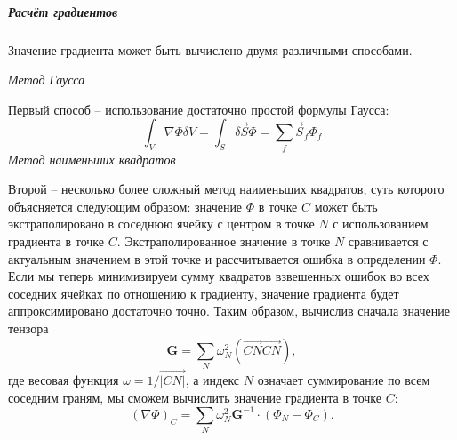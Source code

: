 		\subparagraph{Расчёт градиентов\\}
		
		    Значение градиента может быть вычислено двумя различными способами.
			
			\textit{Метод Гаусса}
			
			Первый способ -- использование достаточно простой формулы Гаусса:
			\begin{equation}
				\int_V \nabla \Phi \delta V = \int_S \vec{\delta S} \Phi = \sum_f \vec{S}_f \Phi_f
			\end{equation}
			\newpage
			\textit{Метод наименьших квадратов}
			
			Второй -- несколько более сложный метод наименьших квадратов, суть которого объясняется следующим образом: значение $\Phi$ в точке $C$ может быть экстраполировано в соседнюю ячейку с центром в точке $N$ с использованием градиента в точке $C$. Экстраполированное значение в точке $N$ сравнивается с актуальным значением в этой точке и рассчитывается ошибка в определении $\Phi$. Если мы теперь минимизируем сумму квадратов взвешенных ошибок во всех соседних ячейках по отношению к градиенту, значение градиента будет аппроксимировано достаточно точно. Таким образом, вычислив сначала значение тензора
			\begin{equation}
				\mathbf{G} = \sum_N \omega_N^2 (\vec{CN}\vec{CN}),
			\end{equation}
			где весовая функция $\omega = 1/\vec{|CN|}$, а индекс $N$ означает суммирование по всем соседним граням, мы сможем вычислить значение градиента в точке $C$:
			\begin{equation}
				(\nabla \Phi)_C = \sum_N \omega_N^2 \mathbf{G}^{-1} \cdot  (\Phi_N - \Phi_C).
			\end{equation}
